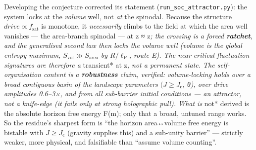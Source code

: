 \documentclass[
  10pt,
]{article}
\begin{document}
Developing the conjecture corrected its statement
(\texttt{run\_soc\_attractor.py}): the system locks at the \emph{volume}
well, not \emph{at} the spinodal. Because the structure
\(drive \propto  f_{\mathrm{sat}}\) is monotone, it \emph{necessarily}
climbs to the field at which the area well vanishes --- the area-branch
spinodal --- at z ≈ z\emph{; the crossing is a forced \textbf{ratchet},
and the generalised second law then locks the volume well (volume is the
global entropy maximum, \(S_{\mathrm{vol}} \gg  S_{\mathrm{area}}\) by
\(R/\ell _{\mathrm{P}}\), route E). The near-critical fluctuation
signatures are therefore a }transient* at z\emph{, not a permanent
state. The self-organisation content is a \textbf{robustness} claim,
verified: volume-locking holds over a broad contiguous basin of the
landscape parameters \((J \geq  J_{\mathrm{c}}\), θ), over drive
amplitudes 0.6--3×, and from all sub-barrier initial conditions --- an
attractor, not a knife-edge (it fails only at strong holographic pull).
What is }not* derived is the absolute horizon free energy F(m); only
that a broad, untuned range works. So the residue's sharpest form is
``the horizon area↔volume free energy is bistable with
\(J \geq  J_{\mathrm{c}}\) (gravity supplies this) and a sub-unity
barrier'' --- strictly weaker, more physical, and falsifiable than
``assume volume counting''.
\end{document}
